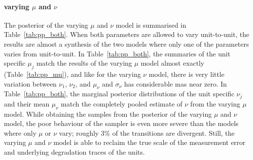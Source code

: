 \paragraph{varying $\mu$ and $\nu$} The posterior of the varying $\mu$ and $\nu$ model is summarised in Table~\ref{tab:pp_both}. When both parameters are allowed to vary unit-to-unit, the results are almost a synthesis of the two models where only one of the parameters varies from unit-to-unit. In Table~\ref{tab:pp_both}, the summaries of the unit specific $\mu_j$ match the results of the varying $\mu$ model almost exactly (Table~\ref{tab:pp_mu}), and like for the varying $\nu$ model, there is very little variation between $\nu_1$, $\nu_2$, and $\mu_\nu$ and $\sigma_\nu$ has considerable mas near zero. In Table~\ref{tab:pp_both}, the marginal posterior distributions of the unit specific $\nu_j$ and their mean $\mu_\nu$ match the completely pooled estimate of $\nu$ from the varying $\mu$ model. While obtaining the samples from the posterior of the varying $\mu$ and $\nu$ model, the poor behaviour of the sampler is even more severe than the models where only $\mu$ or $\nu$ vary; roughly 3\% of the transitions are divergent. Still, the varying $\mu$ and $\nu$ model is able to reclaim the true scale of the measurement error and underlying degradation traces of the units.




